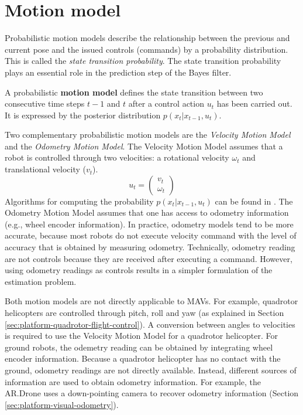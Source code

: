 		\section{Motion model}
		\label{sec:motion_model}
Probabilistic motion models describe the relationship between the previous and current pose and the issued controls (commands) by a probability distribution. This is called the \textit{state transition probability}.
The state transition probability plays an essential role in the prediction step of the Bayes filter.
\begin{mydef}
A probabilistic \textbf{motion model} defines the state transition between two consecutive time steps $t-1$ and $t$ after a control action $u_{t}$ has been carried out. It is expressed by the posterior distribution $p (x_t | x_{t-1}, u_{t})$.
\end{mydef}

Two complementary probabilistic motion models are the \textit{Velocity Motion Model} and the \textit{Odometry Motion Model}.
The Velocity Motion Model assumes that a robot is controlled through two velocities: a rotational velocity $\omega_t$ and translational velocity ($v_t$).
\begin{equation}
u_t = 
\left( \begin{array}{c}
v_t \\
\omega_t \end{array} \right)
\end{equation}
Algorithms for computing the probability $p (x_t | x_{t-1}, u_{t})$ can be found in \cite{fox2005probabilistic}.
The Odometry Motion Model assumes that one has access to odometry information (e.g., wheel encoder information).
In practice, odometry models tend to be more accurate, because most robots do not execute velocity command with the level of accuracy that is obtained by measuring odometry.
Technically, odometry reading are not controls because they are received after executing a command.
However, using odometry readings as controls results in a simpler formulation of the estimation problem.

Both motion models are not directly applicable to MAVs.
For example, quadrotor helicopters are controlled through pitch, roll and yaw (as explained in Section \ref{sec:platform-quadrotor-flight-control}).
A conversion between angles to velocities is required to use the Velocity Motion Model for a quadrotor helicopter.
For ground robots, the odemetry reading can be obtained by integrating wheel encoder information.
Because a quadrotor helicopter has no contact with the ground, odometry readings are not directly available.
Instead, different sources of information are used to obtain odometry information.
For example, the AR.Drone uses a down-pointing camera to recover odometry information (Section \ref{sec:platform-visual-odometry}).


